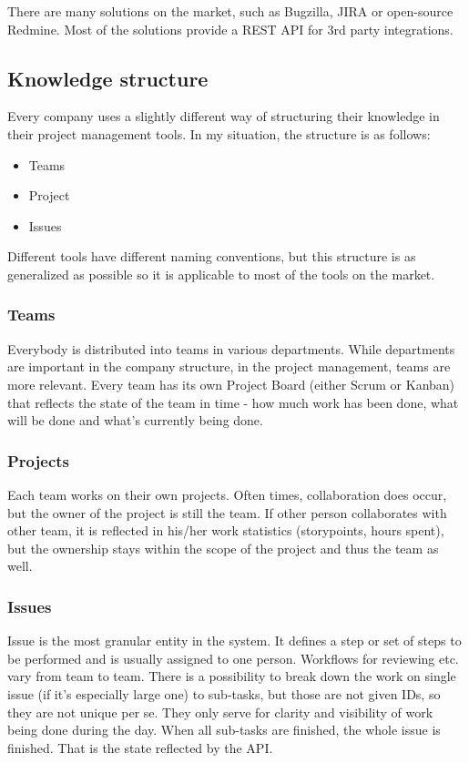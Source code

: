 There are many solutions on the market, such as Bugzilla, JIRA or open-source Redmine. Most of the solutions provide a REST API for 3rd party integrations.

\subsection{Knowledge structure}

Every company uses a slightly different way of structuring their knowledge in their project management tools. In my situation, the structure is as follows:

\begin{itemize}
	\item Teams
	\item Project
	\item Issues
\end{itemize}

Different tools have different naming conventions, but this structure is as generalized as possible so it is applicable to most of the tools on the market.

\subsubsection{Teams}

Everybody is distributed into teams in various departments. While departments are important in the company structure, in the project management, teams are more relevant. Every team has its own Project Board (either Scrum or Kanban) that reflects the state of the team in time - how much work has been done, what will be done and what's currently being done.

\subsubsection{Projects}

Each team works on their own projects. Often times, collaboration does occur, but the owner of the project is still the team. If other person collaborates with other team, it is reflected in his/her work statistics  (storypoints, hours spent), but the ownership stays within the scope of the project and thus the team as well.

\subsubsection{Issues}

Issue is the most granular entity in the system. It defines a step or set of steps to be performed and is usually assigned to one person. Workflows for reviewing etc. vary from team to team. There is a possibility to break down the work on single issue (if it's especially large one) to sub-tasks, but those are not given IDs, so they are not unique per se. They only serve for clarity and visibility of work being done during the day. When all sub-tasks are finished, the whole issue is finished. That is the state reflected by the API.

